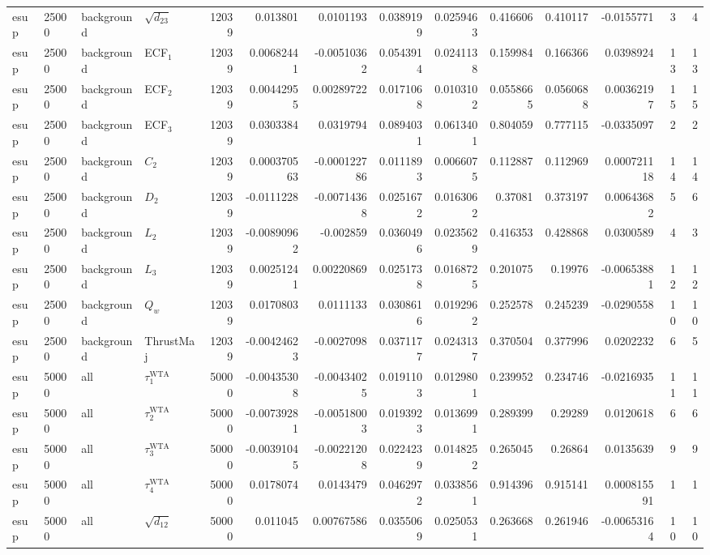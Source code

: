 \begin{landscape}
\begin{longtable}{llll r rrrr rr r rr}
esup & 25000 & background & $\sqrt{d_{23}}$ & 12039 & 0.013801 & 0.0101193 & 0.0389199 & 0.0259463 & 0.416606 & 0.410117 & -0.0155771 & 3 & 4 \\
esup & 25000 & background & ECF$_1$ & 12039 & 0.00682441 & -0.00510362 & 0.0543914 & 0.0241138 & 0.159984 & 0.166366 & 0.0398924 & 13 & 13 \\
esup & 25000 & background & ECF$_2$ & 12039 & 0.00442955 & 0.00289722 & 0.0171068 & 0.0103102 & 0.0558665 & 0.0560688 & 0.00362197 & 15 & 15 \\
esup & 25000 & background & ECF$_3$ & 12039 & 0.0303384 & 0.0319794 & 0.0894031 & 0.0613401 & 0.804059 & 0.777115 & -0.0335097 & 2 & 2 \\
esup & 25000 & background & $C_2$ & 12039 & 0.000370563 & -0.000122786 & 0.0111893 & 0.0066075 & 0.112887 & 0.112969 & 0.000721118 & 14 & 14 \\
esup & 25000 & background & $D_2$ & 12039 & -0.0111228 & -0.00714368 & 0.0251672 & 0.0163062 & 0.37081 & 0.373197 & 0.00643682 & 5 & 6 \\
esup & 25000 & background & $L_2$ & 12039 & -0.00890962 & -0.002859 & 0.0360496 & 0.0235629 & 0.416353 & 0.428868 & 0.0300589 & 4 & 3 \\
esup & 25000 & background & $L_3$ & 12039 & 0.00251241 & 0.00220869 & 0.0251738 & 0.0168725 & 0.201075 & 0.19976 & -0.00653881 & 12 & 12 \\
esup & 25000 & background & $Q_w$ & 12039 & 0.0170803 & 0.0111133 & 0.0308616 & 0.0192962 & 0.252578 & 0.245239 & -0.0290558 & 10 & 10 \\
esup & 25000 & background & ThrustMaj & 12039 & -0.00424623 & -0.0027098 & 0.0371177 & 0.0243137 & 0.370504 & 0.377996 & 0.0202232 & 6 & 5 \\
esup & 50000 & all & $\tau_1^{\mathrm{WTA}}$ & 50000 & -0.00435308 & -0.00434025 & 0.0191103 & 0.0129801 & 0.239952 & 0.234746 & -0.0216935 & 11 & 11 \\
esup & 50000 & all & $\tau_2^{\mathrm{WTA}}$ & 50000 & -0.00739281 & -0.00518003 & 0.0193923 & 0.0136991 & 0.289399 & 0.29289 & 0.0120618 & 6 & 6 \\
esup & 50000 & all & $\tau_3^{\mathrm{WTA}}$ & 50000 & -0.00391045 & -0.00221208 & 0.0224239 & 0.0148252 & 0.265045 & 0.26864 & 0.0135639 & 9 & 9 \\
esup & 50000 & all & $\tau_4^{\mathrm{WTA}}$ & 50000 & 0.0178074 & 0.0143479 & 0.0462972 & 0.0338561 & 0.914396 & 0.915141 & 0.000815591 & 1 & 1 \\
esup & 50000 & all & $\sqrt{d_{12}}$ & 50000 & 0.011045 & 0.00767586 & 0.0355069 & 0.0250531 & 0.263668 & 0.261946 & -0.00653164 & 10 & 10 \\

\end{longtable}
\end{landscape}
